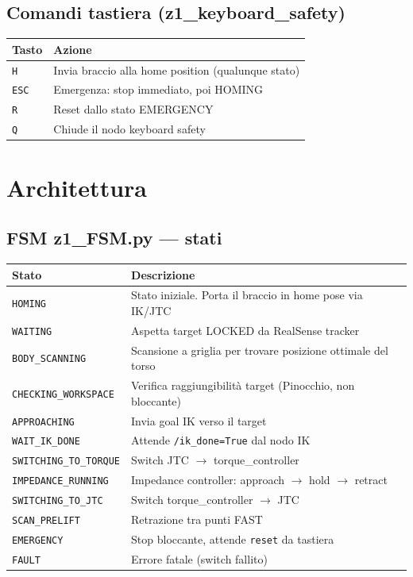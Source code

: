 \documentclass[a4paper,11pt]{article}
\begin{document}
\subsection*{Comandi tastiera (z1\_keyboard\_safety)}
\begin{center}
\begin{tabular}{ll}
\toprule
\textbf{Tasto} & \textbf{Azione} \\
\midrule
\texttt{H}   & Invia braccio alla home position (qualunque stato) \\
\texttt{ESC} & Emergenza: stop immediato, poi HOMING \\
\texttt{R}   & Reset dallo stato EMERGENCY \\
\texttt{Q}   & Chiude il nodo keyboard safety \\
\bottomrule
\end{tabular}
\end{center}

\section{Architettura}

\subsection*{FSM z1\_FSM.py — stati}

\begin{center}
\begin{tabular}{lp{9.5cm}}
\toprule
\textbf{Stato} & \textbf{Descrizione} \\
\midrule
\texttt{HOMING}              & Stato iniziale. Porta il braccio in home pose via IK/JTC \\
\texttt{WAITING}             & Aspetta target LOCKED da RealSense tracker \\
\texttt{BODY\_SCANNING}      & Scansione a griglia per trovare posizione ottimale del torso \\
\texttt{CHECKING\_WORKSPACE} & Verifica raggiungibilità target (Pinocchio, non bloccante) \\
\texttt{APPROACHING}         & Invia goal IK verso il target \\
\texttt{WAIT\_IK\_DONE}      & Attende \texttt{/ik\_done=True} dal nodo IK \\
\texttt{SWITCHING\_TO\_TORQUE} & Switch JTC $\to$ torque\_controller \\
\texttt{IMPEDANCE\_RUNNING}  & Impedance controller: approach $\to$ hold $\to$ retract \\
\texttt{SWITCHING\_TO\_JTC}  & Switch torque\_controller $\to$ JTC \\
\texttt{SCAN\_PRELIFT}       & Retrazione tra punti FAST \\
\texttt{EMERGENCY}           & Stop bloccante, attende \texttt{reset} da tastiera \\
\texttt{FAULT}               & Errore fatale (switch fallito) \\
\bottomrule
\end{tabular}
\end{center}
\end{document}
